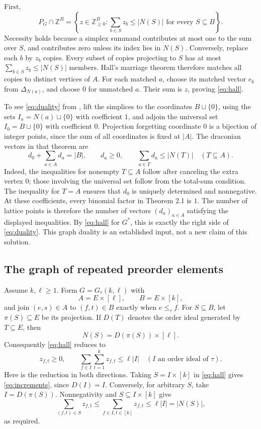 \documentclass[11pt]{article}
\newcommand{\Z}{\mathbb Z}
\begin{document}
First,
\begin{equation}\label{eq:hall}
 P_G\cap\Z^B=
 \left\{z\in\Z_{\ge0}^B:
          \sum_{b\in S}z_b\le |N(S)|\text{ for every }S\subseteq B\right\}.
\end{equation}
Necessity holds because a simplex summand contributes at most
one to the sum over $S$, and contributes zero unless its index
lies in $N(S)$. Conversely, replace each $b$ by $z_b$ copies.
Every subset of copies projecting to $S$ has at most
$\sum_{b\in S}z_b\le|N(S)|$ members. Hall's marriage theorem
therefore matches all copies to distinct vertices of $A$.
For each matched $a$, choose its matched vector $e_b$ from
$\Delta_{N(a)}$, and choose $0$ for unmatched $a$.
Their sum is $z$, proving \eqref{eq:hall}.

To see \eqref{eq:duality} from \cite[Theorem 2.1]{AC}, lift the
simplices to the coordinates $B\sqcup\{0\}$, using the sets
$I_a=N(a)\sqcup\{0\}$ with coefficient $1$, and adjoin the
universal set $I_0=B\sqcup\{0\}$ with coefficient $0$.
Projection forgetting coordinate $0$ is a bijection of integer
points, since the sum of all coordinates is fixed at $|A|$.
The draconian vectors in that theorem are
\[
 d_0+\sum_{a\in A}d_a=|B|,\qquad d_a\ge0,
 \qquad \sum_{a\in T}d_a\le |N(T)|\quad(T\subseteq A).
\]
Indeed, the inequalities for nonempty $T\subseteq A$ follow
after canceling the extra vertex $0$; those involving the
universal set follow from the total-sum condition. The inequality
for $T=A$ ensures that $d_0$ is uniquely determined and nonnegative.
At these coefficients, every binomial factor in Theorem 2.1
is $1$. The number of lattice points is therefore the number of
vectors $(d_a)_{a\in A}$ satisfying the displayed inequalities.
By \eqref{eq:hall} for $G^*$, this is exactly the right side of
\eqref{eq:duality}. This graph duality is an established input,
not a new claim of this solution.

\subsection*{The graph of repeated preorder elements}
Assume $k,\ell\ge1$. Form $G=G_\tau(k,\ell)$ with
\[
 A=E\times[\ell],\qquad B=E\times[k],
\]
and join $(e,s)\in A$ to $(f,t)\in B$ exactly when
$e\le_\tau f$. For $S\subseteq B$, let $\pi(S)\subseteq E$
be its projection. If $D(T)$ denotes the order ideal generated
by $T\subseteq E$, then
\[
 N(S)=D(\pi(S))\times[\ell].
\]
Consequently \eqref{eq:hall} reduces to
\begin{equation}\label{eq:increments}
 z_{f,t}\ge0,\qquad
 \sum_{f\in I}\sum_{t=1}^k z_{f,t}\le\ell|I|
 \quad(I\text{ an order ideal of }\tau).
\end{equation}
Here is the reduction in both directions. Taking $S=I\times[k]$
in \eqref{eq:hall} gives \eqref{eq:increments}, since $D(I)=I$.
Conversely, for arbitrary $S$, take $I=D(\pi(S))$.
Nonnegativity and $S\subseteq I\times[k]$ give
\[
 \sum_{(f,t)\in S}z_{f,t}
 \le\sum_{f\in I,t\in[k]}z_{f,t}
 \le\ell|I|=|N(S)|,
\]
as required.
\end{document}
